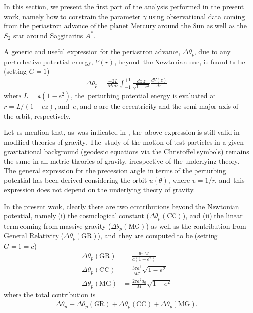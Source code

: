 \documentclass[aps,amsmath,amssymb,twocolumn]{revtex4}
\begin{document}
In this section, we present the first part of the analysis performed in the present work, namely how to constrain the parameter $\gamma$ using observational data coming from the periastron advance of the planet Mercury around the Sun as well as the $S_2$ star around  Saggitarius $A^*$.

A generic and useful expression for the periastron advance, $\Delta \theta_p$, due to any perturbative potential energy, $V(r)$, beyond~the Newtonian one, is found to be (setting $G=1$)~\cite{Adkins:2007et}
%
\begin{align}
\Delta \theta_p = \frac{-2L}{Mme} \int_{-1}^{+1} \frac{dz \  z}{\sqrt{1-z^2}}\frac{dV(z)}{dz}
\end{align}
%
where $L = a (1-e^2)$, the~perturbing potential energy is evaluated at $r=L/(1+e z)$, and~$e$, and $a$ are the eccentricity and 
the semi-major axis of the orbit, respectively.
%

Let us mention that, as~was indicated in \cite{Zakharov:2018omt}, the~above expression is still valid in modified theories of gravity. The~study of the motion of test particles in a given gravitational background (geodesic equations via the Christoffel symbols) remains the same in all metric theories of gravity, irrespective of the underlying theory. The~general expression for the precession angle in terms of the perturbing potential has been derived considering the orbit $u(\theta)$, where $u=1/r$, and~this expression does not depend on the underlying theory of gravity.
%

In the present work, clearly there are two contributions beyond the Newtonian potential, namely (i) the cosmological 
constant ($\Delta \theta_p(\text{CC})$), and (ii) the linear term coming from massive gravity ($\Delta \theta_p(\text{MG})$)
as well as the contribution from General Relativity ($\Delta \theta_p(\text{GR})$), and~they are computed 
to be (setting $G=1=c$) \cite{Adkins:2007et}
%
\begin{align}
\Delta \theta_p(\text{GR}) &= \frac{6 \pi M}{a (1-e^2)}
\\
\Delta \theta_p(\text{CC}) &= \frac{3 \pi a^3}{Ml^2} \sqrt{1-e^2}
\\
\Delta \theta_p(\text{MG}) &= \frac{2 \pi a^2 a_0}{M}\sqrt{1-e^2}
\end{align}
%
where the total contribution is 
%
\begin{align}
\Delta \theta_p \equiv \Delta \theta_p(\text{GR})
+
\Delta \theta_p(\text{CC}) + \Delta \theta_p(\text{MG}).
\end{align}
 
\end{document}
